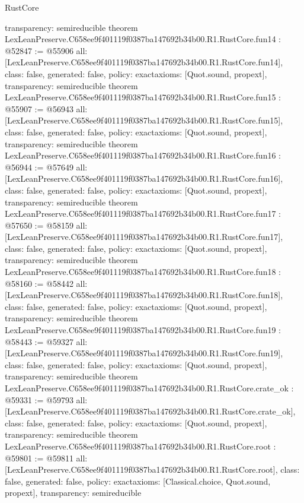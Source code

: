 \begin{lexlean}{RustCore}
\begin{coremodule}
{  transparency: semireducible
}
theorem LexLeanPreserve.C658ee9f401119f0387ba147692b34b00.R1.RustCore.fun14 : @52847 := @55906 {
  all: [LexLeanPreserve.C658ee9f401119f0387ba147692b34b00.R1.RustCore.fun14],
  class: false,
  generated: false,
  policy: exact{axioms: [Quot.sound, propext]},
  transparency: semireducible
}
theorem LexLeanPreserve.C658ee9f401119f0387ba147692b34b00.R1.RustCore.fun15 : @55907 := @56943 {
  all: [LexLeanPreserve.C658ee9f401119f0387ba147692b34b00.R1.RustCore.fun15],
  class: false,
  generated: false,
  policy: exact{axioms: [Quot.sound, propext]},
  transparency: semireducible
}
theorem LexLeanPreserve.C658ee9f401119f0387ba147692b34b00.R1.RustCore.fun16 : @56944 := @57649 {
  all: [LexLeanPreserve.C658ee9f401119f0387ba147692b34b00.R1.RustCore.fun16],
  class: false,
  generated: false,
  policy: exact{axioms: [Quot.sound, propext]},
  transparency: semireducible
}
theorem LexLeanPreserve.C658ee9f401119f0387ba147692b34b00.R1.RustCore.fun17 : @57650 := @58159 {
  all: [LexLeanPreserve.C658ee9f401119f0387ba147692b34b00.R1.RustCore.fun17],
  class: false,
  generated: false,
  policy: exact{axioms: [Quot.sound, propext]},
  transparency: semireducible
}
theorem LexLeanPreserve.C658ee9f401119f0387ba147692b34b00.R1.RustCore.fun18 : @58160 := @58442 {
  all: [LexLeanPreserve.C658ee9f401119f0387ba147692b34b00.R1.RustCore.fun18],
  class: false,
  generated: false,
  policy: exact{axioms: [Quot.sound, propext]},
  transparency: semireducible
}
theorem LexLeanPreserve.C658ee9f401119f0387ba147692b34b00.R1.RustCore.fun19 : @58443 := @59327 {
  all: [LexLeanPreserve.C658ee9f401119f0387ba147692b34b00.R1.RustCore.fun19],
  class: false,
  generated: false,
  policy: exact{axioms: [Quot.sound, propext]},
  transparency: semireducible
}
theorem LexLeanPreserve.C658ee9f401119f0387ba147692b34b00.R1.RustCore.crate_ok : @59331 := @59793 {
  all: [LexLeanPreserve.C658ee9f401119f0387ba147692b34b00.R1.RustCore.crate_ok],
  class: false,
  generated: false,
  policy: exact{axioms: [Quot.sound, propext]},
  transparency: semireducible
}
theorem LexLeanPreserve.C658ee9f401119f0387ba147692b34b00.R1.RustCore.root : @59801 := @59811 {
  all: [LexLeanPreserve.C658ee9f401119f0387ba147692b34b00.R1.RustCore.root],
  class: false,
  generated: false,
  policy: exact{axioms: [Classical.choice, Quot.sound, propext]},
  transparency: semireducible
}


\end{coremodule}
\end{lexlean}
